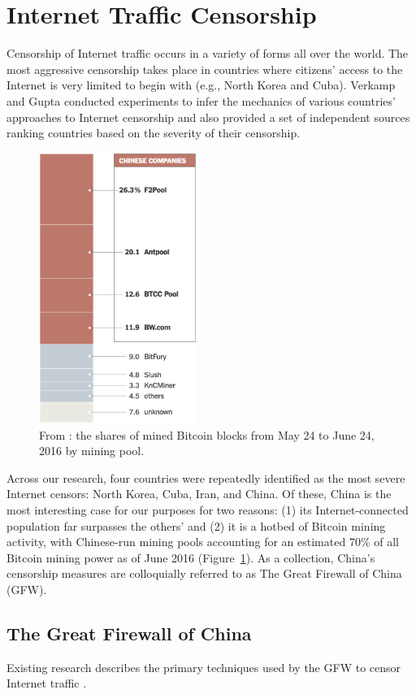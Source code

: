 \section{Internet Traffic Censorship}
Censorship of Internet traffic occurs in a variety of forms all over the world. The most aggressive censorship takes place in countries where citizens' access to the Internet is very limited to begin with (e.g., North Korea and Cuba). Verkamp and Gupta \cite{Verkamp2012} conducted experiments to infer the mechanics of various countries' approaches to Internet censorship and also provided a set of independent sources ranking countries based on the severity of their censorship. 

\begin{figure}[h]
\centering
\includegraphics[height=250pt]{Images/NYT-Bitcoin-China.png}
\caption{From \cite{Popper2016}: the shares of mined Bitcoin blocks from May 24 to June 24, 2016 by mining pool.}
\label{fig:BTCPools}
\end{figure}

Across our research, four countries were repeatedly identified as the most severe Internet censors: North Korea, Cuba, Iran, and China. Of these, China is the most interesting case for our purposes for two reasons: (1) its Internet-connected population far surpasses the others' and (2) it is a hotbed of Bitcoin mining activity, with Chinese-run mining pools accounting for an estimated 70\% of all Bitcoin mining power as of June 2016 (Figure~\ref{fig:BTCPools}). As a collection, China's censorship measures are colloquially referred to as The Great Firewall of China (GFW).

\subsection{The Great Firewall of China}
Existing research describes the primary techniques used by the GFW to censor Internet traffic \cite{GFWStanford}.


